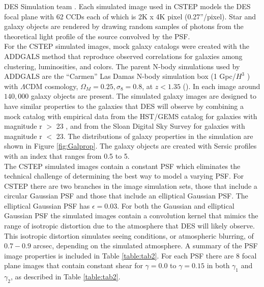 DES Simulation team \citep{DESsim}. Each simulated image used in CSTEP models the DES focal plane
with 62 CCDs each of which is 2K x 4K pixel (0.27''/pixel). Star and galaxy objects are
rendered by drawing random samples of
photons from the theoretical light profile of the source convolved 
by the PSF. \\
For the CSTEP simulated images, mock galaxy catalogs were
created with the ADDGALS  method that reproduce observed correlations
for galaxies among clustering, luminosities, and colors. 
The parent N-body simulations used by ADDGALS are the ``Carmen'' Las Damas
N-body simulation box (1 Gpc/$H^3$ ) with  $ \Lambda$CDM cosmology, $\Omega_M
= 0.25, \sigma_8 = 0.8$, at $z< 1.35 $
(\cite{LasDamas}). In each image around $ 140,000 $ galaxy objects are
present. The simulated galaxy images are designed to have similar properties to
the galaxies that DES will observe by combining a mock
catalog with empirical data from the HST/GEMS catalog for galaxies
with magnitude r $ > $ 23 , and from the Sloan Digital Sky Survey for
galaxies with magnitude r $ < $ 23. The distributions of galaxy
properties in the simulation are shown in Figure \ref{fig:Galprop}. 
The galaxy objects are created with Sersic profiles with an
index that ranges from 0.5 to 5.  \\
\indent The CSTEP simulated images contain a constant
PSF which eliminates the technical challenge of determining the best
way to model a varying PSF. For CSTEP there are two
branches in the image simulation sets, those that include a circular
Gaussian PSF and those that include an elliptical Gaussian PSF. 
The elliptical Gaussian PSF has $ \epsilon =
0.03 $. For both the Gaussian and elliptical Gaussian
PSF the simulated images contain a convolution kernel that mimics the
range of isotropic distortion due to the atmosphere that DES will
likely observe. This isotropic distortion simulates seeing conditions,
or atmospheric blurring, of $ 0.7 - 0.9 $ arcsec, depending on the simulated atmosphere.
A summary of the PSF image properties is included in Table \ref{table:tab2}. 
For each PSF there are 8 focal plane images that contain constant
shear for $\gamma = 0.0$ to $\gamma = 0.15$ in both
$\gamma_1$ and $\gamma_2$, as described in Table \ref{table:tab2}.  
